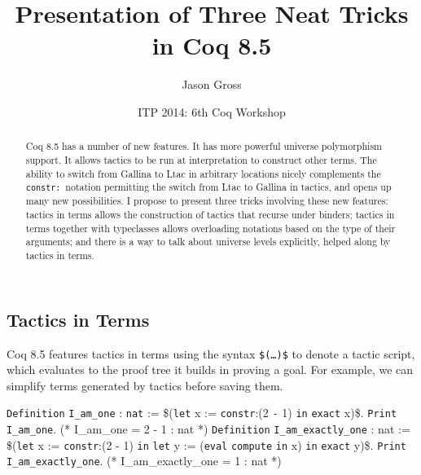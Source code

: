 \documentclass{article}
\title{Presentation of Three Neat Tricks in Coq 8.5}
\author{Jason Gross}
\date{ITP 2014: 6th Coq Workshop}
\makeatletter
\gdef\@makeopenbrace<\catcode`{>
\gdef\@makeclosebrace<\catcode`}>
\newcommand{\processcommands}[1]{{%
  \catcode`\\=0\relax
  \@makeopenbrace=1\relax
  \@makeclosebrace=2\relax
  \def\{{\texttt{\mytextbraceleft}}
  \def\}{\texttt{\mytextbraceright}}
  \scantokens{#1}%
}}
\newcommand{\processcommandsinverbatimline}{\expandafter\processcommands\expandafter{\the\verbatim@line}}
\newenvironment{coqcode}{\begingroup
  \vspace{0.5\baselineskip}
  \let\trivlist\relax
  \let\endtrivlist\relax
  \let\item\relax
  \setlength{\parsep}{0pt}%
  \setlength{\parskip}{0pt}%
  \setlength{\topsep}{0pt}%
  \setlength{\@topsepadd}{0pt}%
  \setlength{\partopsep}{0pt}%
  \setlength{\@topsep}{0pt}%
  \let\old@@par\@@par
  \let\@@par\relax
  \let\old@vskip\vskip
  \let\vskip\relax
  \verbatim
  \let\@@par\old@@par
  \let\vskip\old@vskip
  \let\verbatim@processline=\processcommandsinverbatimline
}{\endverbatim\endgroup\vspace{0.5\baselineskip}}
\newcommand{\coqdockw}[1]{\texttt {\textcolor{kwred}{#1}}}
\newcommand{\coqdocvar}[1]{\textcolor{varpurple}{#1}}
\newcommand{\coqdoccst}[1]{\texttt{\textcolor{defgreen}{#1}}}%
\newcommand{\coqdocind}[1]{\texttt{\textcolor{indblue}{#1}}}%
\newcommand{\coqdoctac}[1]{\texttt{#1}}
\newcommand{\coqdocinductive}[1]{\coqdocind{#1}}
\newcommand{\coqdocdefinition}[1]{\coqdoccst{#1}}
\newcommand{\coqdocnotation}[1]{\coqdockw{#1}}
\makeatother
\begin{document}
\begin{abstract}
Coq 8.5 has a number of new features.  It has more powerful universe polymorphism support.  It allows tactics to be run at interpretation to construct other terms.  The ability to switch from Gallina to Ltac in arbitrary locations nicely complements the \texttt{constr:}~notation permitting the switch from Ltac to Gallina in tactics, and opens up many new possibilities.  I propose to present three tricks involving these new features: tactics in terms allows the construction of tactics that recurse under binders; tactics in terms together with typeclasses allows overloading notations based on the type of their arguments; and there is a way to talk about universe levels explicitly, helped along by tactics in terms.
\end{abstract}
\subsection{Tactics in Terms}
Coq 8.5 features tactics in terms using the syntax \texttt{\$(\ldots)\$} to denote a tactic script, which evaluates to the proof tree it builds in proving a goal.  For example, we can simplify terms generated by tactics before saving them.
\begin{coqcode}
\coqdockw{Definition} \coqdocdefinition{I_am_one} : \coqdocinductive{nat} := \$(\coqdockw{let} \coqdocvar{x} := \coqdockw{constr}:(2 \coqdocnotation{-} 1) \coqdoctac{in} \coqdoctac{exact} \coqdocvar{x})\$.
\coqdockw{Print} \coqdocdefinition{I_am_one}.
(* I_am_one = 2 - 1 : nat *)
\coqdockw{Definition} \coqdocdefinition{I_am_exactly_one} : \coqdocvar{nat} := \$(\coqdockw{let} \coqdocvar{x} := \coqdockw{constr}:(2 - 1) \coqdoctac{in}
                                       \coqdockw{let} \coqdocvar{y} := (\coqdoctac{eval} \coqdoctac{compute} \coqdoctac{in} \coqdocvar{x}) \coqdoctac{in}
                                       \coqdoctac{exact} \coqdocvar{y})\$.
\coqdockw{Print} \coqdocdefinition{I_am_exactly_one}.
(* I_am_exactly_one = 1 : nat *)
\end{coqcode}
\end{document}
